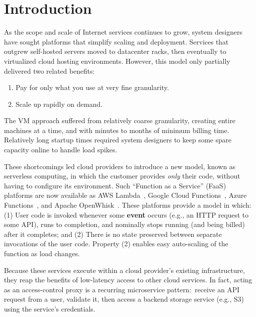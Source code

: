\section{Introduction}
\label{sec:intro}

As the scope and scale of Internet services continues to grow, system designers
have sought platforms that simplify scaling and deployment.
Services that outgrew self-hosted servers moved to datacenter racks, then
eventually to virtualized cloud hosting environments.
However, this model only partially delivered two related benefits:
\begin{enumerate}
\item Pay for only what you use at very fine granularity.
\item Scale up rapidly on demand.
\end{enumerate}

The VM approach suffered from relatively coarse granularity, creating entire
machines at a time, and with minutes to months of minimum billing
time.
Relatively long startup
times required system designers to keep some spare capacity online to handle load
spikes.

These shortcomings led cloud providers to introduce a new model, known as
serverless computing, in which the customer provides \textit{only} their code,
without having to configure its environment.   Such ``Function as a Service''
(FaaS) platforms are now available as AWS Lambda~\cite{www-amazon-lambda}, Google
Cloud Functions~\cite{www-google-cf}, Azure Functions~\cite{www-microsoft-af}, and
Apache OpenWhisk~\cite{www-apache-openwhisk}.  These platforms provide a model in
which: (1)  User code is invoked whenever some \textbf{event} occurs (e.g., an HTTP
request to some API), runs to completion, and nominally stops running (and being
billed) after it completes; and (2)  There is no state preserved between
separate invocations of the user code.  Property (2) enables easy auto-scaling
of the function as load changes.


Because these services execute within a cloud provider's existing
infrastructure, they reap the benefits of low-latency access to other cloud
services.  In fact, acting as an access-control proxy is a recurring microservice
pattern:\ receive an API request from a user, validate it, then access
a backend storage service (e.g., S3) using the service's credentials.

